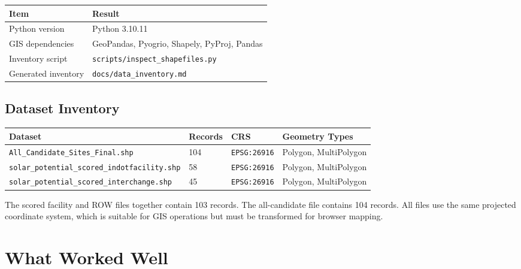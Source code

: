 \documentclass[11pt]{article}
\newcommand{\code}[1]{\nolinkurl{#1}}
\begin{document}
\begin{longtable}{L{0.32\textwidth} L{0.58\textwidth}}
\toprule
\textbf{Item} & \textbf{Result} \\
\midrule
\endhead
Python version & Python 3.10.11 \\
GIS dependencies & GeoPandas, Pyogrio, Shapely, PyProj, Pandas \\
Inventory script & \code{scripts/inspect_shapefiles.py} \\
Generated inventory & \code{docs/data_inventory.md} \\
\bottomrule
\end{longtable}

\subsection{Dataset Inventory}

\begin{longtable}{L{0.27\textwidth} L{0.13\textwidth} L{0.20\textwidth} L{0.27\textwidth}}
\toprule
\textbf{Dataset} & \textbf{Records} & \textbf{CRS} & \textbf{Geometry Types} \\
\midrule
\endhead
\code{All_Candidate_Sites_Final.shp} & 104 & \code{EPSG:26916} & Polygon, MultiPolygon \\
\code{solar_potential_scored_indotfacility.shp} & 58 & \code{EPSG:26916} & Polygon, MultiPolygon \\
\code{solar_potential_scored_interchange.shp} & 45 & \code{EPSG:26916} & Polygon, MultiPolygon \\
\bottomrule
\end{longtable}

The scored facility and ROW files together contain 103 records. The all-candidate
file contains 104 records. All files use the same projected coordinate system,
which is suitable for GIS operations but must be transformed for browser mapping.

\section{What Worked Well}
\end{document}
